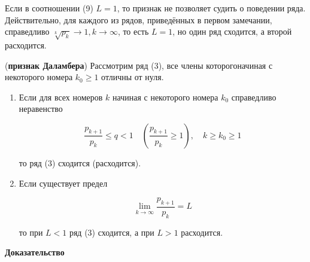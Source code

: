 \begin{note}
	Если в соотношении (9) $L = 1$, то признак не позволяет судить о поведении ряда. Действительно, для каждого из рядов, приведённых в первом замечании, справедливо $\sqrt[k]{p_k}\rightarrow 1, k\rightarrow\infty$, то есть $L = 1$, но один ряд сходится, а второй расходится.
\end{note}

\begin{theorem}
	(\textbf{признак Даламбера}) Рассмотрим ряд (3), все члены которогоначиная с некоторого номера $k_0 \geqslant 1$ отличны от нуля.
	
	\begin{enumerate}
		\item Если для всех номеров $k$ начиная с некоторого номера $k_0$ справедливо неравенство
		
		\begin{equation}
			\frac{p_{k + 1}}{p_k} \leqslant q < 1 \quad \left( \frac{p_{k + 1}}{p_k} \geqslant 1 \right), \quad k \geqslant k_0 \geqslant 1
		\end{equation}
		
		то ряд (3) сходится (расходится).
		
		\item Если существует предел
		
		\begin{equation}
			\displaystyle\lim_{k \rightarrow \infty} \frac{p_{k + 1}}{p_k} = L
		\end{equation}
		
		то при $L < 1$ ряд (3) сходится, а при $L > 1$ расходится.
	\end{enumerate}
\end{theorem}

\textbf{Доказательство}

